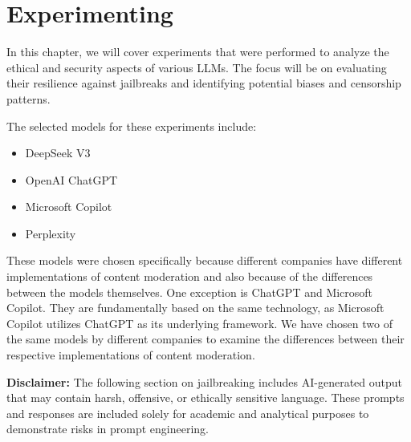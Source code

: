 \chapter{Experimenting \label{cha:experimenting}}


In this chapter, we will cover experiments that were performed to analyze the ethical and security aspects of various LLMs. The focus will be on evaluating their resilience against jailbreaks and identifying potential biases and censorship patterns.

The selected models for these experiments include:
\begin{itemize}
    \item DeepSeek V3
    \item OpenAI ChatGPT
    \item Microsoft Copilot
    \item Perplexity


    
\end{itemize}

These models were chosen specifically because different companies have different implementations of content moderation and also because of the differences between the models themselves. One exception is ChatGPT and Microsoft Copilot. They are fundamentally based on the same technology, as Microsoft Copilot utilizes ChatGPT as its underlying framework. We have chosen two of the same models by different companies to examine the differences between their respective implementations of content moderation.

\textbf{Disclaimer:} The following section on jailbreaking includes AI-generated output that may contain harsh, offensive, or ethically sensitive language. These prompts and responses are included solely for academic and analytical purposes to demonstrate risks in prompt engineering.


